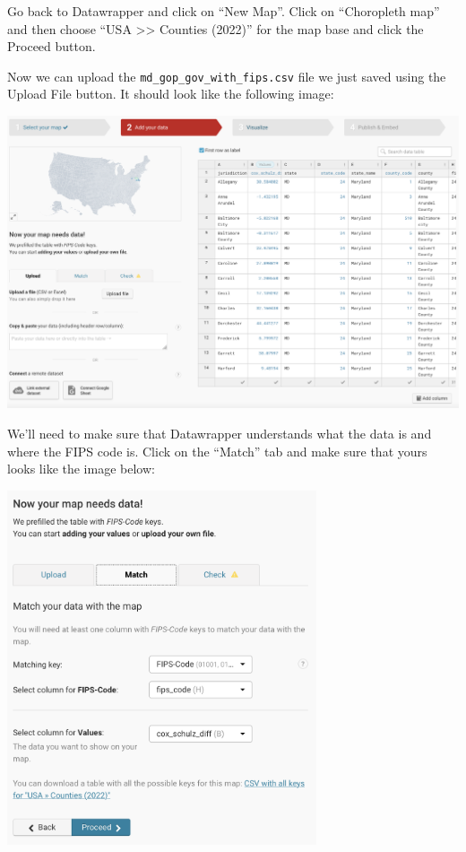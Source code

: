 \documentclass[
  letterpaper,
  DIV=11,
  numbers=noendperiod]{scrreprt}
\begin{document}
Go back to Datawrapper and click on ``New Map''. Click on ``Choropleth
map'' and then choose ``USA \textgreater\textgreater{} Counties (2022)''
for the map base and click the Proceed button.

Now we can upload the \texttt{md\_gop\_gov\_with\_fips.csv} file we just
saved using the Upload File button. It should look like the following
image:

\includegraphics[width=9.01in,height=\textheight]{./images/datawrapper7.png}

We'll need to make sure that Datawrapper understands what the data is
and where the FIPS code is. Click on the ``Match'' tab and make sure
that yours looks like the image below:

\includegraphics[width=3.59in,height=\textheight]{./images/datawrapper8.png}
\end{document}

